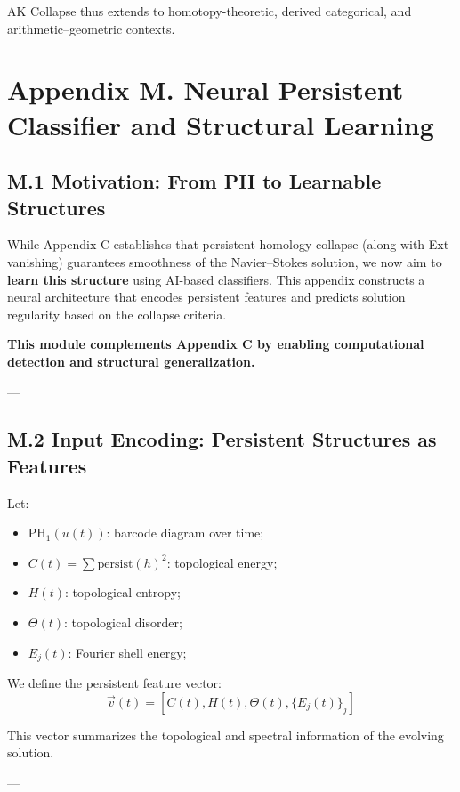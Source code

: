 \documentclass[11pt]{article}
\theoremstyle{definition}
\begin{document}
AK Collapse thus extends to homotopy-theoretic, derived categorical, and arithmetic–geometric contexts.


\section*{Appendix M. Neural Persistent Classifier and Structural Learning}

\subsection*{M.1 Motivation: From PH to Learnable Structures}

While Appendix C establishes that persistent homology collapse (along with Ext-vanishing) guarantees smoothness of the Navier--Stokes solution,  
we now aim to \textbf{learn this structure} using AI-based classifiers. This appendix constructs a neural architecture that encodes persistent features and predicts solution regularity based on the collapse criteria.

\textbf{This module complements Appendix C by enabling computational detection and structural generalization.}

---

\subsection*{M.2 Input Encoding: Persistent Structures as Features}

Let:
\begin{itemize}
  \item \( \mathrm{PH}_1(u(t)) \): barcode diagram over time;
  \item \( C(t) = \sum \mathrm{persist}(h)^2 \): topological energy;
  \item \( H(t) \): topological entropy;
  \item \( \Theta(t) \): topological disorder;
  \item \( E_j(t) \): Fourier shell energy;
\end{itemize}

We define the persistent feature vector:
\[
\vec{v}(t) = \left[ C(t), H(t), \Theta(t), \{E_j(t)\}_j \right]
\]

This vector summarizes the topological and spectral information of the evolving solution.

---
\end{document}
